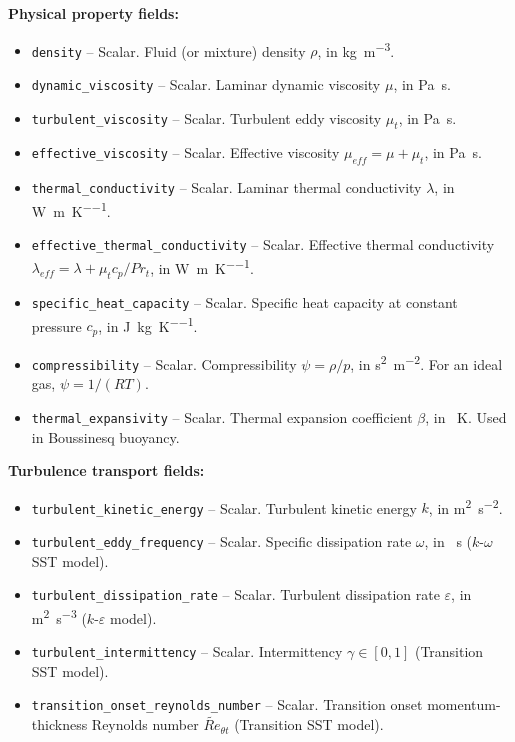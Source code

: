\documentclass[12pt]{extarticle}
\newcommand{\<}{\langle}
\renewcommand{\>}{\rangle}
\theoremstyle{definition}
\begin{document}
\medskip
\noindent\textbf{Physical property fields:}
\begin{itemize}
    \item \texttt{density} -- Scalar. Fluid (or mixture) density $\rho$, in \si{\kilogram\per\cubic\metre}.
    \item \texttt{dynamic\_viscosity} -- Scalar. Laminar dynamic viscosity $\mu$, in \si{\pascal\second}.
    \item \texttt{turbulent\_viscosity} -- Scalar. Turbulent eddy viscosity $\mu_t$, in \si{\pascal\second}.
    \item \texttt{effective\_viscosity} -- Scalar. Effective viscosity $\mu_{eff} = \mu + \mu_t$, in \si{\pascal\second}.
    \item \texttt{thermal\_conductivity} -- Scalar. Laminar thermal conductivity $\lambda$, in \si{\watt\per\metre\per\kelvin}.
    \item \texttt{effective\_thermal\_conductivity} -- Scalar. Effective thermal conductivity $\lambda_{eff} = \lambda + \mu_t c_p / Pr_t$, in \si{\watt\per\metre\per\kelvin}.
    \item \texttt{specific\_heat\_capacity} -- Scalar. Specific heat capacity at constant pressure $c_p$, in \si{\joule\per\kilogram\per\kelvin}.
    \item \texttt{compressibility} -- Scalar. Compressibility $\psi = \rho/p$, in \si{\second\squared\per\square\metre}. For an ideal gas, $\psi = 1/(RT)$.
    \item \texttt{thermal\_expansivity} -- Scalar. Thermal expansion coefficient $\beta$, in \si{\per\kelvin}. Used in Boussinesq buoyancy.
\end{itemize}

\medskip
\noindent\textbf{Turbulence transport fields:}
\begin{itemize}
    \item \texttt{turbulent\_kinetic\_energy} -- Scalar. Turbulent kinetic energy $k$, in \si{\square\metre\per\square\second}.
    \item \texttt{turbulent\_eddy\_frequency} -- Scalar. Specific dissipation rate $\omega$, in \si{\per\second} ($k$-$\omega$ SST model).
    \item \texttt{turbulent\_dissipation\_rate} -- Scalar. Turbulent dissipation rate $\varepsilon$, in \si{\square\metre\per\cubic\second} ($k$-$\varepsilon$ model).
    \item \texttt{turbulent\_intermittency} -- Scalar. Intermittency $\gamma \in [0,1]$ (Transition SST model).
    \item \texttt{transition\_onset\_reynolds\_number} -- Scalar. Transition onset momentum-thickness Reynolds number $\widetilde{Re}_{\theta t}$ (Transition SST model).
\end{itemize}
\end{document}
